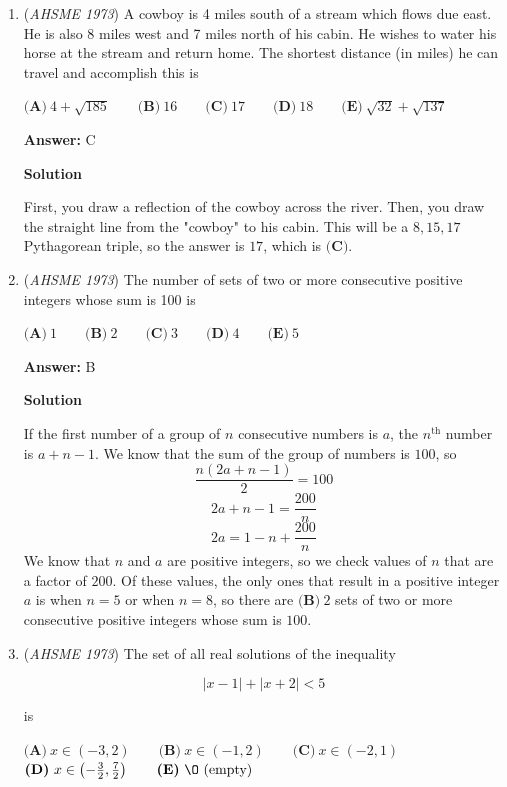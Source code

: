 \begin{enumerate}
 


	\item (\textit{AHSME 1973}) A cowboy is 4 miles south of a stream which flows due east. He is also 8 miles west and 7 miles north of his cabin. He wishes to water his horse at the stream and return home. The shortest distance (in miles) he can travel and accomplish this is 


 $\textbf{(A)}\ 4+\sqrt{185} \qquad \textbf{(B)}\ 16 \qquad \textbf{(C)}\ 17 \qquad \textbf{(D)}\ 18 \qquad \textbf{(E)}\ \sqrt{32}+\sqrt{137}$

 \textbf{Answer: }C



\textbf{Solution}

First, you draw a reflection of the cowboy across the river. Then, you draw the straight line from the "cowboy" to his cabin. This will be a $8, 15, 17$ Pythagorean triple, so the answer is $17$, which is $\boxed{\textbf{(C)}}$.

 


	\item (\textit{AHSME 1973}) The number of sets of two or more consecutive positive integers whose sum is 100 is


 $\textbf{(A)}\ 1 \qquad \textbf{(B)}\ 2 \qquad \textbf{(C)}\ 3 \qquad \textbf{(D)}\ 4 \qquad \textbf{(E)}\ 5$

 \textbf{Answer: }B



\textbf{Solution}

If the first number of a group of $n$ consecutive numbers is $a$, the $n^\text{th}$ number is $a+n-1$.  We know that the sum of the group of numbers is $100$, so
 \[\frac{n(2a+n-1)}{2} = 100\]
 \[2a+n-1=\frac{200}{n}\]
 \[2a = 1-n + \frac{200}{n}\]We know that $n$ and $a$ are positive integers, so we check values of $n$ that are a factor of $200$.  Of these values, the only ones that result in a positive integer $a$ is when $n = 5$ or when $n = 8$, so there are $\boxed{\textbf{(B)}\ 2}$ sets of two or more consecutive positive integers whose sum is $100$.

 


	\item (\textit{AHSME 1973}) The set of all real solutions of the inequality 


 
 \[|x - 1| + |x + 2| < 5\]


 is 


 $\textbf{(A)}\ x \in ( - 3,2) \qquad \textbf{(B)}\ x \in ( - 1,2) \qquad \textbf{(C)}\ x \in ( - 2,1) \qquad$
$\textbf{(D)}\ x \in \left( - \frac32,\frac72\right) \qquad \textbf{(E)}\ \O \text{ (empty})$



\end{enumerate}

